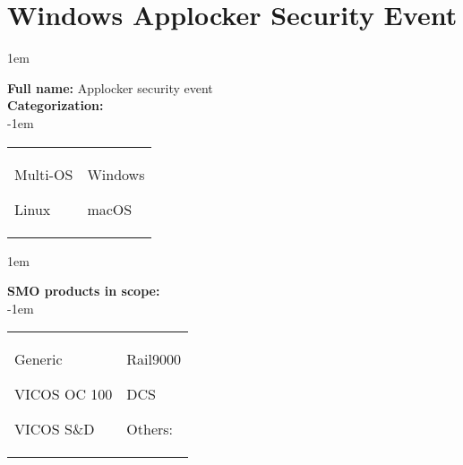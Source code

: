 
%
%

\section{Windows Applocker Security Event}
\label{15071}

\openup 1em

\textbf{Full name:} Applocker security event\hrulefill \\
{\bf Categorization:} \\

\openup -1em
\vspace{-3em}

\begin{tabular}{p{}p{}}

\begin{todolist}
  	\item Multi-OS
	\item Linux
\end{todolist}
&
\begin{todolist}
	\item[\done] Windows
	\item macOS
\end{todolist}

\end{tabular}

\openup 1em

{\bf SMO products in scope:} \\

\openup -1em
\vspace{-3em}

\begin{tabular}{p{}p{}}

\begin{todolist}
  \item[\done] Generic
  \item[\done] VICOS OC 100
  \item[\done] VICOS S\&D
\end{todolist}
&
\begin{todolist}
  \item Rail9000
  \item DCS
  \item Others: \hrulefill
\end{todolist}

\end{tabular}

